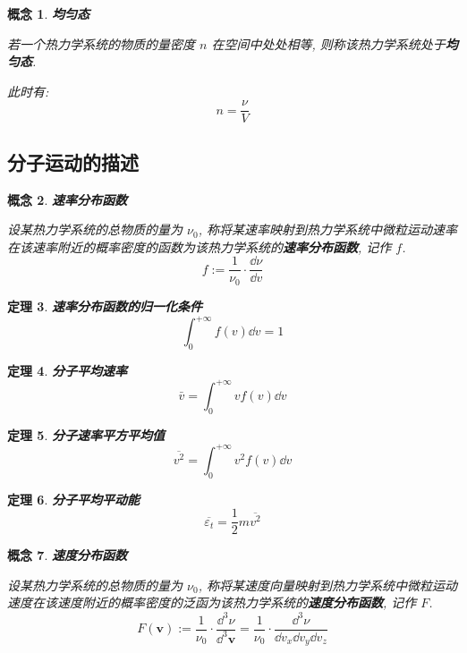 \documentclass[UTF8]{ctexart}
\newcommand{\<}{\langle}
\renewcommand{\>}{\rangle}                              %
\newenvironment{dfn_box}{
    \begin{tcolorbox}[enhanced, colback=dfn_green2, boxrule=0pt, frame hidden,
        borderline west={0.7mm}{0.1mm}{dfn_green1},breakable]
    }
    {\end{tcolorbox}}
\newenvironment{thm_box}{
    \begin{tcolorbox}[enhanced, colback=thm_blue2, boxrule=0pt, frame hidden,
        borderline west={0.7mm}{0.1mm}{thm_blue1},breakable]
    }
    {\end{tcolorbox}}
\theoremstyle{MyStyle} %
\newtheorem{definition}{概念}[subsection]
\newenvironment{cpt}{\begin{dfn_box}\begin{definition}}{\end{definition}\end{dfn_box}}
\newtheorem{theorem}[definition]{定理}
\newenvironment{thm}{\begin{thm_box}\begin{theorem}}{\end{theorem}\end{thm_box}}
\begin{document}
        \begin{cpt}
            \textbf{均匀态}

            若一个热力学系统的物质的量密度 \(n\) 在空间中处处相等, 则称该热力学系统处于\textbf{均匀态}. 

            此时有: 
            \[n=\frac{\nu}{V}\]
        \end{cpt}

    \subsection{分子运动的描述}
        
        \begin{cpt}
            \textbf{速率分布函数}

            设某热力学系统的总物质的量为 \(\nu_0\), 称将某速率映射到热力学系统中微粒运动速率在该速率附近的概率密度的函数为该热力学系统的\textbf{速率分布函数}, 记作 \(f\). 
            \[f:=\frac{1}{\nu_0}\cdot\frac{\dd\nu}{\dd v}\]
        \end{cpt}
        
        \begin{thm}
            \textbf{速率分布函数的归一化条件}
            \[\int_0^{+\infty}f(v)\dd v=1\]
        \end{thm}
        
        \begin{thm}
            \textbf{分子平均速率}
            \[\bar{v}=\int_0^{+\infty}vf(v)\dd v\]
        \end{thm}
        
        \begin{thm}
            \textbf{分子速率平方平均值}
            \[\overline{v^2}=\int_0^{+\infty}v^2f(v)\dd v\]
        \end{thm}
        
        \begin{thm}
            \textbf{分子平均平动能}
            \[\overline{\varepsilon_t}=\frac{1}{2}m\overline{v^2}\]
        \end{thm}
        
        \begin{cpt}
            \textbf{速度分布函数}

            设某热力学系统的总物质的量为 \(\nu_0\), 称将某速度向量映射到热力学系统中微粒运动速度在该速度附近的概率密度的泛函为该热力学系统的\textbf{速度分布函数}, 记作 \(F\). 
            \[F(\bm{v}):=\frac{1}{\nu_0}\cdot\frac{\dd^3\nu}{\dd^3\bm{v}}=\frac{1}{\nu_0}\cdot\frac{\dd^3\nu}{\dd v_x\dd v_y\dd v_z}\]
        \end{cpt}
        
\end{document}
